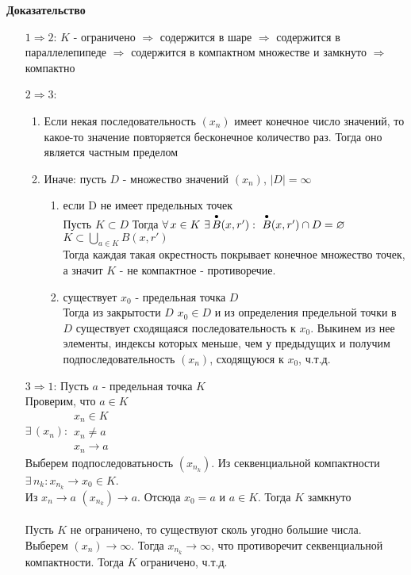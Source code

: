\documentclass[12pt]{article}
\begin{document}
\textbf{Доказательство}
\begin{enumerate}
    \item[$1\Rightarrow 2$:] $K$ - ограничено $\Rightarrow$ содержится в шаре $\Rightarrow$ содержится в параллелепипеде $\Rightarrow$ содержится в компактном множестве и замкнуто $\Rightarrow$ компактно
    \item[$2\Rightarrow 3$:]
    \begin{enumerate}
        \item Если некая последовательность $(x_n)$ имеет конечное число значений, то какое-то значение повторяется бесконечное количество раз. Тогда оно является частным пределом
        \item Иначе: пусть $D$ - множество значений $(x_n)$, $|D| = \infty$
        \begin{enumerate}
            \item если D не имеет предельных точек\\
            Пусть $K\subset D$
            Тогда $\forall\,x\in K\ \exists\,\overdot{B}(x,r'):\ \overdot{B}(x,r')\cap D = \varnothing$\\
            $K \subset \bigcup_{a\in K} B(x,r')$\\
            Тогда каждая такая окрестность покрывает конечное множество точек, а значит $K$ - не компактное - противоречие.
            \item существует $x_0$ - предельная точка $D$\\
            Тогда из закрытости $D$ $x_0\in D$ и из определения предельной точки в $D$ существует сходящаяся последовательность к $x_0$. Выкинем из нее элементы, индексы которых меньше, чем у предыдущих и получим подпоследовательность $(x_n)$, сходящуюся к $x_0$, ч.т.д.
        \end{enumerate}
    \end{enumerate}
    \item [$3\Rightarrow 1$:] Пусть $a$ - предельная точка $K$\\
    Проверим, что $a \in K$\\
    $\exists\,(x_n): \begin{array}{l}
         x_n\in K \\
         x_n \neq a \\
         x_n\rightarrow a
    \end{array}$\\
    Выберем подпоследоватьность $(x_{n_k})$. Из секвенциальной компактности $\exists\,n_k: x_{n_k} \rightarrow x_0 \in K$.\\
    Из $x_n\rightarrow a$ $(x_{n_k}) \rightarrow a$. Отсюда $x_0 = a$ и $a \in K$. Тогда $K$ замкнуто\\\\
    Пусть $K$ не ограничено, то существуют сколь угодно большие числа. Выберем $(x_n) \rightarrow \infty$. Тогда $x_{n_k}\rightarrow \infty$, что противоречит секвенциальной компактности. Тогда $K$ ограничено, ч.т.д.
\end{enumerate}
\end{document}
